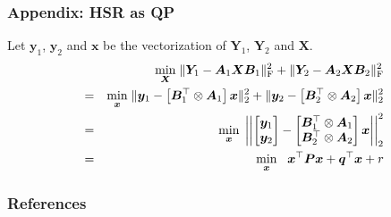 \documentclass[10pt,mathserif]{beamer}
\newcommand{\Tr}{^\top}%
\newcommand{\Fr}{_\text F}
\begin{document}
    \begin{frame}\label{fr:HSR-as-QP}
        \frametitle{Appendix: HSR as QP \hyperlink{fr:HSR-is-QP}{}}
        Let $\bm y_1$, $\bm y_2$ and $\bm x$ be the vectorization of
        $\bm Y_1$, $\bm Y_2$ and $\bm X$.
        \begin{eqnarray*}
            &   &
            \underset{\bm X}{\min} \;
            \Vert \bm Y_1 - \bm A_1 \bm X \bm B_1 \Vert\Fr^2 +
            \Vert \bm Y_2 - \bm A_2 \bm X \bm B_2 \Vert\Fr^2 \\
            & = &
            \underset{\bm x}{\min} \;
            \Vert \bm y_1 - \left[ \bm B_1\Tr \otimes \bm A_1 \right] \bm x \Vert_2^2 +
            \Vert \bm y_2 - \left[ \bm B_2\Tr \otimes \bm A_2 \right] \bm x \Vert_2^2 \\
            & = &
            \underset{\bm x}{\min} \;
            \left|\left| \begin{bmatrix} \bm y_1 \\ \bm y_2 \end{bmatrix} -
                         \begin{bmatrix} \bm B_1\Tr \otimes \bm A_1 \\
                                         \bm B_2\Tr \otimes \bm A_2 \end{bmatrix} \bm x\right|\right|_2^2 \\
            & = &
            \underset{\bm x}{\min} \; \; \;
            \bm x\Tr \bm P \bm x + \bm q\Tr \bm x + r
        \end{eqnarray*}
    \end{frame}
    \begin{frame}[allowframebreaks]
        \frametitle{References}
        
        \footnotesize
        
    \end{frame}
\end{document}
